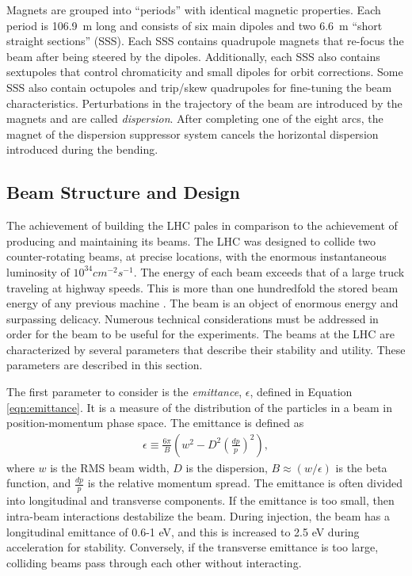 Magnets are grouped into ``periods'' with identical magnetic properties.
Each period is 106.9~m long and consists of six main dipoles and two 6.6~m ``short straight sections'' (SSS).
Each SSS contains quadrupole magnets that re-focus the beam after being steered by the dipoles.
Additionally, each SSS also contains sextupoles that control chromaticity and small dipoles for orbit corrections.
Some SSS also contain octupoles and trip/skew quadrupoles for fine-tuning the beam characteristics.
Perturbations in the trajectory of the beam are introduced by the magnets and are called \emph{dispersion}.
After completing one of the eight arcs, the magnet of the dispersion suppressor system cancels the horizontal dispersion introduced during the bending.

\subsection{Beam Structure and Design}
The achievement of building the LHC pales in comparison to the achievement of producing and maintaining its beams.
The LHC was designed to collide two counter-rotating beams, at precise locations, with the enormous instantaneous luminosity of $10^{34}cm^{-2}s^{-1}$.
The energy of each beam exceeds that of a large truck traveling at highway speeds.
This is more than one hundredfold the stored beam energy of any previous machine \cite{lyndon}.
The beam is an object of enormous energy and surpassing delicacy.
Numerous technical considerations must be addressed in order for the beam to be useful for the experiments.
The beams at the LHC are characterized by several parameters that describe their stability and utility.
These parameters are described in this section.

The first parameter to consider is the \emph{emittance}, $\epsilon$, defined in Equation \ref{eqn:emittance}.
It is a measure of the distribution of the particles in a beam in position-momentum phase space.
The emittance is defined as
\begin{equation}\begin{split}\label{eqn:emittance}
\epsilon \equiv \frac{6\pi}{B}\left(w^2-D^2\left(\frac{dp}{p}\right)^2\right),
\end{split}\end{equation} 
where $w$ is the RMS beam width, $D$ is the dispersion, $B\approx(w/\epsilon)$ is the beta function, and $\frac{dp}{p}$ is the relative momentum spread.
The emittance is often divided into longitudinal and transverse components.
If the emittance is too small, then intra-beam interactions destabilize the beam. 
During injection, the beam has a longitudinal emittance of 0.6-1 eV, and this is increased to 2.5 eV during acceleration for stability.
Conversely, if the transverse emittance is too large, colliding beams pass through each other without interacting.
\cite{boussard,lyndon,pdg2016}

